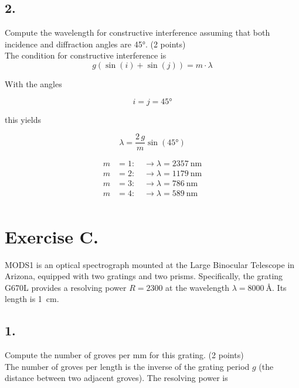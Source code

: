 \documentclass[11pt,a4paper,twoside]{article}
\begin{document}
\subsection*{2.} Compute the wavelength for constructive interference assuming that both incidence and
diffraction angles are \ang{45}. (2 points) \\

The condition for constructive interference is
\begin{equation}
g \left( \sin{ \left( i \right) } + \sin{ \left( j \right) } \right) =m\cdot\lambda
\end{equation}

With the angles 

\begin{equation}
 i=j=\ang{45}
\end{equation}

this yields

\begin{equation}
 \lambda = \frac{2 \, g}{m} \sin{ \left( \ang{45} \right) }
\end{equation}

\begin{align*}
m&=1:\quad \rightarrow \lambda=\SI{2357}{\nano\meter}\\
m&=2:\quad \rightarrow \lambda=\SI{1179}{\nano\meter}\\
m&=3:\quad \rightarrow \lambda=\SI{786}{\nano\meter}\\
m&=4:\quad \rightarrow \lambda=\SI{589}{\nano\meter}\\
\end{align*}

\section*{Exercise C.}

MODS1 is an optical spectrograph mounted at the Large Binocular Telescope in 
Arizona, equipped with two gratings and two prisms. Specifically, the grating 
G670L provides a resolving power $R = \num{2300}$ at the wavelength 
$\lambda = \SI{8000}{\angstrom}$. Its length is \SI{1}{\cm}.

\subsection*{1.} Compute the number of groves per mm for this grating. (2 points) \\

The number of groves per length is the inverse of the grating period 
$g$ (the distance between two adjacent groves). The resolving power is 
\end{document}

